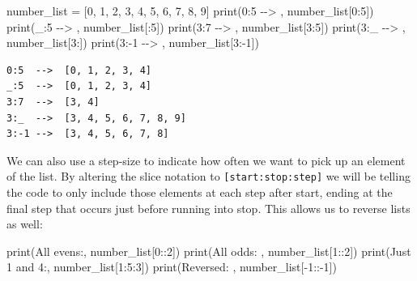 \documentclass[
  letterpaper,
  DIV=11,
  numbers=noendperiod]{scrreprt}
\newenvironment{Shaded}{\begin{snugshade}}{\end{snugshade}}
\newcommand{\BuiltInTok}[1]{\textcolor[rgb]{0.00,0.23,0.31}{#1}}
\newcommand{\DecValTok}[1]{\textcolor[rgb]{0.68,0.00,0.00}{#1}}
\newcommand{\NormalTok}[1]{\textcolor[rgb]{0.00,0.23,0.31}{#1}}
\newcommand{\OperatorTok}[1]{\textcolor[rgb]{0.37,0.37,0.37}{#1}}
\newcommand{\StringTok}[1]{\textcolor[rgb]{0.13,0.47,0.30}{#1}}
\begin{document}
\begin{Shaded}
\begin{Highlighting}[]
\NormalTok{number\_list }\OperatorTok{=}\NormalTok{ [}\DecValTok{0}\NormalTok{, }\DecValTok{1}\NormalTok{, }\DecValTok{2}\NormalTok{, }\DecValTok{3}\NormalTok{, }\DecValTok{4}\NormalTok{, }\DecValTok{5}\NormalTok{, }\DecValTok{6}\NormalTok{, }\DecValTok{7}\NormalTok{, }\DecValTok{8}\NormalTok{, }\DecValTok{9}\NormalTok{]}
\BuiltInTok{print}\NormalTok{(}\StringTok{\textquotesingle{}0:5  {-}{-}\textgreater{} \textquotesingle{}}\NormalTok{, number\_list[}\DecValTok{0}\NormalTok{:}\DecValTok{5}\NormalTok{])}
\BuiltInTok{print}\NormalTok{(}\StringTok{\textquotesingle{}\_:5  {-}{-}\textgreater{} \textquotesingle{}}\NormalTok{, number\_list[:}\DecValTok{5}\NormalTok{])}
\BuiltInTok{print}\NormalTok{(}\StringTok{\textquotesingle{}3:7  {-}{-}\textgreater{} \textquotesingle{}}\NormalTok{, number\_list[}\DecValTok{3}\NormalTok{:}\DecValTok{5}\NormalTok{])}
\BuiltInTok{print}\NormalTok{(}\StringTok{\textquotesingle{}3:\_  {-}{-}\textgreater{} \textquotesingle{}}\NormalTok{, number\_list[}\DecValTok{3}\NormalTok{:])}
\BuiltInTok{print}\NormalTok{(}\StringTok{\textquotesingle{}3:{-}1 {-}{-}\textgreater{} \textquotesingle{}}\NormalTok{, number\_list[}\DecValTok{3}\NormalTok{:}\OperatorTok{{-}}\DecValTok{1}\NormalTok{])}
\end{Highlighting}
\end{Shaded}

\begin{verbatim}
0:5  -->  [0, 1, 2, 3, 4]
_:5  -->  [0, 1, 2, 3, 4]
3:7  -->  [3, 4]
3:_  -->  [3, 4, 5, 6, 7, 8, 9]
3:-1 -->  [3, 4, 5, 6, 7, 8]
\end{verbatim}

We can also use a step-size to indicate how often we want to pick up an
element of the list. By altering the slice notation to
\texttt{{[}start:stop:step{]}} we will be telling the code to only
include those elements at each step after start, ending at the final
step that occurs just before running into stop. This allows us to
reverse lists as well:

\begin{Shaded}
\begin{Highlighting}[]
\BuiltInTok{print}\NormalTok{(}\StringTok{\textquotesingle{}All evens:\textquotesingle{}}\NormalTok{, number\_list[}\DecValTok{0}\NormalTok{::}\DecValTok{2}\NormalTok{])}
\BuiltInTok{print}\NormalTok{(}\StringTok{\textquotesingle{}All odds: \textquotesingle{}}\NormalTok{, number\_list[}\DecValTok{1}\NormalTok{::}\DecValTok{2}\NormalTok{])}
\BuiltInTok{print}\NormalTok{(}\StringTok{\textquotesingle{}Just 1 and 4:\textquotesingle{}}\NormalTok{, number\_list[}\DecValTok{1}\NormalTok{:}\DecValTok{5}\NormalTok{:}\DecValTok{3}\NormalTok{])}
\BuiltInTok{print}\NormalTok{(}\StringTok{\textquotesingle{}Reversed: \textquotesingle{}}\NormalTok{, number\_list[}\OperatorTok{{-}}\DecValTok{1}\NormalTok{::}\OperatorTok{{-}}\DecValTok{1}\NormalTok{])}
\end{Highlighting}
\end{Shaded}
\end{document}
